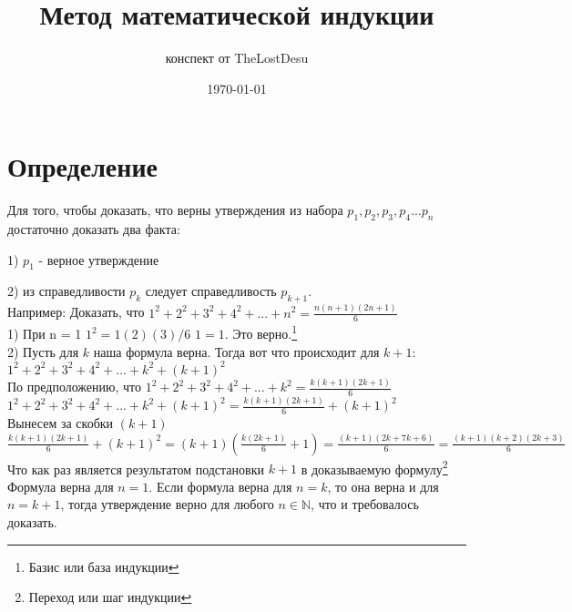 \documentclass[a4paper,12pt]{article}
\author{конспект от TheLostDesu}
\title{Метод математической индукции}
\date{\today}
\begin{document}
\maketitle
\section{Определение}
Для того, чтобы доказать, что верны утверждения из набора $p_{1}, p_{2}, p_{3}, p_{4}...p_{n}$
достаточно доказать два факта:

1) $p_{1}$ - верное утверждение

2) из справедливости $p_{k}$ следует справедливость $p_{k+1}$.\\
Например: Доказать, что $1^2+2^2+3^2+4^2+...+n^2=\frac{n(n+1)(2n+1)}{6}$\\
1) При n = 1 \hspace{50pt} $1^2=1(2)(3)/6$ \hspace{50pt} $1=1$. Это верно.\footnote{Базис или база индукции}\\	
2) Пусть для $k$ наша формула верна. Тогда вот что происходит для $k+1$:\\
$1^2+2^2+3^2+4^2+...+k^2+(k+1)^2$\\
По предположению, что $1^2+2^2+3^2+4^2+...+k^2 = \frac{k(k+1)(2k+1)}{6}$\\
$1^2+2^2+3^2+4^2+...+k^2+(k+1)^2=\frac{k(k+1)(2k+1)}{6}+(k+1)^2$\\
Вынесем за скобки $(k+1)$\\
$\frac{k(k+1)(2k+1)}{6}+(k+1)^2=(k+1)(\frac{k(2k + 1)}{6} + 1)=\frac{(k+1)(2k+7k+6)}{6}=\frac{(k+1)(k+2)(2k+3)}{6}$\\
Что как раз является результатом подстановки $k+1$ в доказываемую формулу\footnote{Переход или шаг индукции}\\
Формула верна для $n = 1$. Если формула верна для $n=k$, то она верна и для $n=k+1$, тогда утверждение верно для любого $n\in\mathbb{N}$, что и требовалось доказать.
\end{document}
